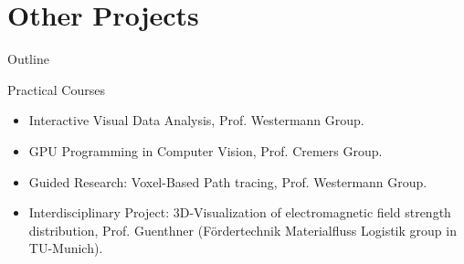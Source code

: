 \documentclass{beamer}
\begin{document}

\section{Other Projects}

\begin{frame}{Outline}
\end{frame}


\begin{frame}{Practical Courses}
	\begin{itemize}
		\item Interactive Visual Data Analysis, Prof. Westermann Group.
		\item GPU Programming in Computer Vision, Prof. Cremers Group.
		\item Guided Research: Voxel-Based Path tracing, Prof. Westermann Group.
		\item Interdisciplinary Project: 3D-Visualization of electromagnetic field strength	distribution, Prof. Guenthner (F{\"o}rdertechnik Materialfluss Logistik group in TU-Munich).
	\end{itemize}
\end{frame}
\end{document}
